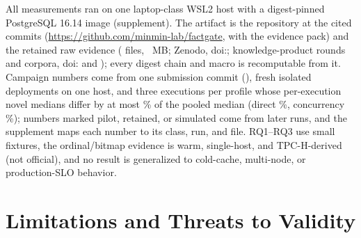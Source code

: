 \documentclass[10pt,journal,compsoc]{IEEEtran}
\begin{document}
All measurements ran on one laptop-class WSL2 host with a digest-pinned
PostgreSQL 16.14 image (supplement). The artifact is the repository at the
cited commits (\url{https://github.com/minmin-lab/factgate}, with the
evidence pack) and the retained raw evidence (\RawEvidenceFiles{} files,
\RawEvidenceMB{}~MB; Zenodo, doi:\RawEvidenceDOI{}; knowledge-product rounds
and corpora, doi:\KbRawEvidenceDOI{} and \KbKeywordRawEvidenceDOI{}); every digest chain
and macro is recomputable from it. Campaign numbers come from one
submission commit
(\FinalVFivePublicationCommit{}), \FinalVFivePublicationDeployments{}
fresh isolated deployments on one host, and three executions per profile
whose per-execution novel medians differ by at most
\FinalVFivePublicationNovelSpreadMaxPct\% of the pooled median (direct
\FinalVFivePublicationDirectSpreadMaxPct\%, concurrency
\FinalVFivePublicationConcurrencySpreadMaxPct\%); numbers marked pilot,
retained, or simulated come from later runs, and the supplement maps each
number to its class, run, and file. RQ1--RQ3 use small fixtures, the
ordinal/bitmap evidence is warm, single-host, and TPC-H-derived (not
official), and no result is generalized to cold-cache, multi-node, or
production-SLO behavior.

\section{Limitations and Threats to Validity}
\label{sec:limits}
\end{document}
